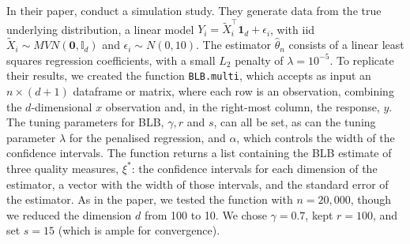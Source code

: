 \documentclass{article}\usepackage[]{graphicx}\usepackage[]{color}
\begin{document}
In their paper, \textcite{Kleiner2014} conduct a simulation study. They generate data from the true underlying distribution, a linear model $Y_i = \tilde X_i^{\top}\textbf{1}_d + \epsilon_i$, with iid $\tilde X_i \sim MVN(\mathbf{0},\mathbb{I}_d)$ and $\epsilon_i \sim N(0,10)$. The estimator $\hat\theta_n$ consists of a linear least squares regression coefficients, with a small $L_2$ penalty of $\lambda=10^{-5}$. To replicate their results, we created the function \texttt{BLB.multi}, which accepts as input an $n \times (d+1)$ dataframe or matrix, where each row is an observation, combining the $d$-dimensional $x$ observation and, in the right-most column, the response, $y$. The tuning parameters for BLB, $\gamma, r$ and $s$, can all be set, as can the tuning parameter $\lambda$ for the penalised regression, and $\alpha$, which controls the width of the confidence intervals. The function returns a list containing the BLB estimate of three quality measures, $\xi^*$: the confidence intervals for each dimension of the estimator, a vector with the width of those intervals, and the standard error of the estimator. As in the paper, we tested the function with $n=20,000$, though we reduced the dimension $d$ from 100 to 10. We chose $\gamma=0.7$, kept $r=100$, and set $s=15$ (which is ample for convergence).
\end{document}
